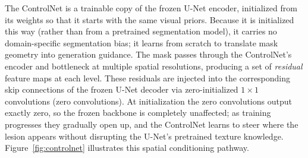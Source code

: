 The ControlNet is a trainable copy of the frozen U-Net encoder, initialized from its weights so that it starts with the same visual priors. Because it is initialized this way (rather than from a pretrained segmentation model), it carries no domain-specific segmentation bias; it learns from scratch to translate mask geometry into generation guidance. The mask passes through the ControlNet's encoder and bottleneck at multiple spatial resolutions, producing a set of \emph{residual} feature maps at each level. These residuals are injected into the corresponding skip connections of the frozen U-Net decoder via zero-initialized $1\times1$ convolutions (zero convolutions). At initialization the zero convolutions output exactly zero, so the frozen backbone is completely unaffected; as training progresses they gradually open up, and the ControlNet learns to steer where the lesion appears without disrupting the U-Net's pretrained texture knowledge. Figure~\ref{fig:controlnet} illustrates this spatial conditioning pathway.

